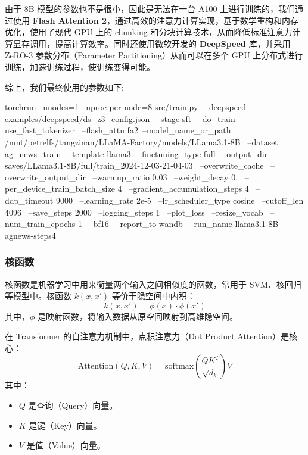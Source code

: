 由于 8B 模型的参数也不是很小，因此是无法在一台 A100 上进行训练的，我们通过使用 \textbf{Flash Attention 2}，通过高效的注意力计算实现，基于数学重构和内存优化，使用了现代 GPU 上的 chunking 和分块计算技术，从而降低标准注意力计算显存调用，提高计算效率。同时还使用微软开发的 \textbf{DeepSpeed} 库，并采用 ZeRO-3 参数分布（Parameter Partitioning）从而可以在多个 GPU 上分布式进行训练，加速训练过程，使训练变得可能。

综上，我们最终使用的参数如下:\begin{textcode}
torchrun --nnodes=1 --nproc-per-node=8 src/train.py \
    --deepspeed examples/deepspeed/ds_z3_config.json \
    --stage sft \
    --do_train \
    --use_fast_tokenizer \
    --flash_attn fa2\
    --model_name_or_path /mnt/petrelfs/tangzinan/LLaMA-Factory/models/LLama3.1-8B \
    --dataset ag_news_train \
    --template llama3 \
    --finetuning_type full \
    --output_dir saves/LLama3.1-8B/full/train_2024-12-03-21-04-03 \
    --overwrite_cache \
    --overwrite_output_dir \
    --warmup_ratio 0.03 \
    --weight_decay 0. \
    --per_device_train_batch_size 4 \
    --gradient_accumulation_steps 4 \
    --ddp_timeout 9000 \
    --learning_rate 2e-5 \
    --lr_scheduler_type cosine \
    --cutoff_len 4096 \
    --save_steps 2000 \
    --logging_steps 1 \
    --plot_loss \
    --resize_vocab \
    --num_train_epochs 1 \
    --bf16 \
    --report_to wandb \
    --run_name llama3.1-8B-agnews-steps4
\end{textcode}

\subsubsection{核函数}

核函数是机器学习中用来衡量两个输入之间相似度的函数，常用于 SVM、核回归等模型中。核函数 \( k(x, x') \) 等价于隐空间中内积：
  \[
  k(x, x') = \phi(x) \cdot \phi(x')
  \]
  其中，\(\phi\) 是映射函数，将输入数据从原空间映射到高维隐空间。

  在 Transformer 的自注意力机制中，点积注意力（Dot Product Attention）是核心：
  \[
  \text{Attention}(Q, K, V) = \text{softmax}\left(\frac{QK^T}{\sqrt{d_k}}\right)V
  \]
  其中：\begin{itemize}
    \item \( Q \) 是查询（Query）向量。
    \item \( K \) 是键（Key）向量。
    \item \( V \) 是值（Value）向量。
  \end{itemize}

